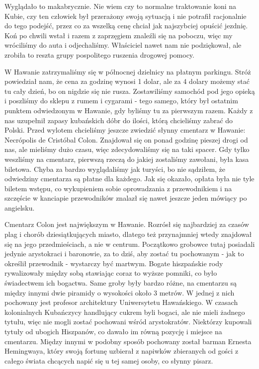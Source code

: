 \noindent Wyglądało to makabrycznie.
Nie wiem czy to normalne traktowanie koni na Kubie, czy ten człowiek był przerażony swoją sytuacją i nie potrafił racjonalnie do tego podejść, przez co za wszelką cenę chciał jak najszybciej opuścić jezdnię.
Koń po chwili wstał i razem z zaprzęgiem znaleźli się na poboczu, więc my wróciliśmy do auta i odjechaliśmy.
Właściciel nawet nam nie podziękował, ale zrobiła to reszta grupy pospolitego ruszenia drogowej pomocy.
\par W Hawanie zatrzymaliśmy się w północnej dzielnicy na płatnym parkingu.
Stróż powiedział nam, że cena za godzinę wynosi 1 dolar, ale za 4 dolary możemy stać tu cały dzień, bo on nigdzie się nie rusza.
Zostawiliśmy samochód pod jego opieką i poszliśmy do sklepu z rumem i cygarami - 
tego samego, który był ostatnim punktem odwiedzonym w Hawanie, gdy byliśmy tu za pierwszym razem.
Każdy z nas uzupełnił zapasy kubańskich dóbr do ilości, którą chcieliśmy zabrać do Polski.
Przed wylotem chcieliśmy jeszcze zwiedzić słynny cmentarz w Hawanie: Necrópolis de Cristóbal Colon.
Znajdował się on ponad godzinę pieszej drogi od nas, ale mieliśmy dużo czasu, więc zdecydowaliśmy się na taki spacer.
Gdy tylko weszliśmy na cmentarz, pierwszą rzeczą do jakiej zostaliśmy zawołani, była kasa biletowa.
Chyba za bardzo wyglądaliśmy jak turyści, bo nie sądziłem, że odwiedziny cmentarza są płatne dla każdego.
Jak się okazało, opłata była nie tyle biletem wstępu, co wykupieniem sobie oprowadzania z przewodnikiem i na szczęście w kanciapie przewodników znalazł się nawet jeszcze jeden mówiący po angielsku.
\par Cmentarz Colon jest największym w Hawanie.
Rozrósł się najbardziej za czasów plag i chorób dziesiątkujących miasto, dlatego też przynajmniej wtedy znajdował się na jego przedmieściach, a nie w centrum.
Początkowo grobowce tutaj posiadali jedynie arystokraci i baronowie, za to dziś, aby zostać tu pochowanym - jak to określił przewodnik - wystarczy być martwym.
Bogate hiszpańskie rody rywalizowały między sobą stawiając coraz to wyższe pomniki, co było świadectwem ich bogactwa.
Same groby były bardzo różne, na cmentarzu są między innymi dwie piramidy o wysokości około 3 metrów.
W jednej z nich pochowany jest profesor architektury Uniwersytetu Hawańskiego.
W czasach kolonialnych Kubańczycy handlujący cukrem byli bogaci, ale nie mieli żadnego tytułu, więc nie mogli zostać pochowani wśród arystokratów.
Niektórzy kupowali tytuły od ubogich Hiszpanów, co dawało im równą pozycję i miejsce na cmentarzu.
Między innymi w podobny sposób pochowany został barman Ernesta Hemingwaya, który swoją fortunę uzbierał z napiwków zbieranych od gości z całego świata chcących napić się u tej samej osoby, co słynny pisarz.
